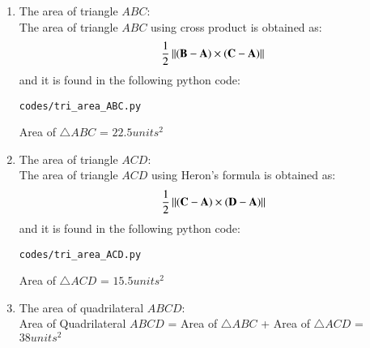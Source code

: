 \begin{enumerate}[label=\thesection.\arabic*.,ref=\thesection.\theenumi]

\item The area of triangle $ABC$: \\
\solution The area of triangle $ABC$ using cross product is obtained as:
$$\frac{1}{2}\left\lVert(\mathbf{B}-\mathbf{A})\times(\mathbf{C}-\mathbf{A})\right\rVert$$
and it is found in the following python code:
\begin{lstlisting}
codes/tri_area_ABC.py
\end{lstlisting} 

Area of $\triangle{ABC}$ = $22.5 units^2$

\item The area of triangle $ACD$: \\
\solution The area of triangle $ACD$ using Heron's formula is obtained as:
$$\frac{1}{2}\left\lVert(\mathbf{C}-\mathbf{A})\times(\mathbf{D}-\mathbf{A})\right\rVert$$
and it is found in the following python code:
\begin{lstlisting}
codes/tri_area_ACD.py
\end{lstlisting} 

Area of $\triangle{ACD}$ = $15.5 units^2$

\item The area of quadrilateral $ABCD$: \\
\solution Area of Quadrilateral $ABCD$ = Area of $\triangle{ABC}$ + Area of $\triangle{ACD}$ = $38 units^2$
\end{enumerate}